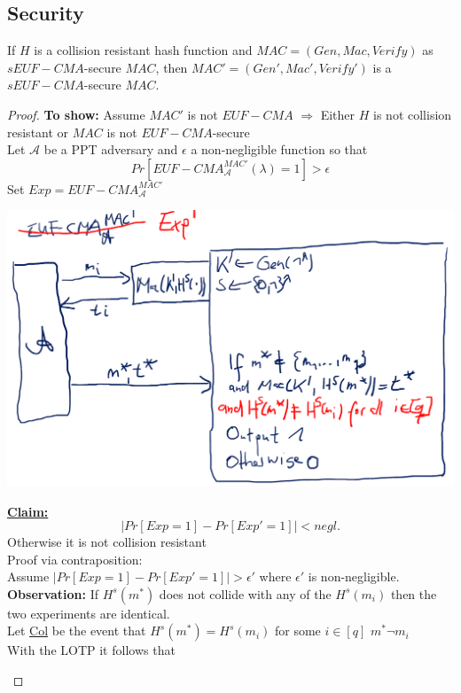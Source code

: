 	\subsection{Security}
		\begin{theorem}
			If $H$ is a collision resistant hash function and $MAC = (Gen,Mac,Verify)$ as $sEUF-CMA$-secure $MAC$, then $MAC' = (Gen',Mac',Verify')$ is a $sEUF-CMA$-secure $MAC$.
		\end{theorem}
		\begin{proof}
			\textbf{To show:}
			Assume $MAC'$ is not $EUF-CMA$ $\Rightarrow$ Either $H$ is not collision resistant or $MAC$ is not $EUF-CMA$-secure\\
			Let $\mathcal{A}$ be a PPT adversary and $\epsilon$ a non-negligible function so that
			$$Pr[EUF-CMA_{\mathcal{A}}^{MAC'}(\lambda) = 1] > \epsilon$$
			Set $Exp = EUF-CMA_{\mathcal{A}}^{MAC'}$
			\begin{center}
				\includegraphics[width=140mm]{Graphics/Authentication/a8.png}
			\end{center}
			\underline{\textbf{Claim:}}
			$$|Pr[Exp = 1] - Pr[Exp' = 1]| < negl.$$
			Otherwise it is not collision resistant\\
			Proof via contraposition:\\
			Assume $|Pr[Exp = 1] - Pr[Exp' = 1]| > \epsilon'$ where $\epsilon'$ is non-negligible.\\
			\textbf{Observation:}
			If $H^s(m^*)$ does not collide with any of the $H^s(m_i)$ then the two experiments are identical.\\
			Let \underline{Col} be the event that $H^s(m^*) = H^s(m_i)$ for some $i \in [q]$ $m^* \neg m_i$\\
			With the LOTP it follows that
			\begin{enumerate}

\end{enumerate}
\end{proof}
